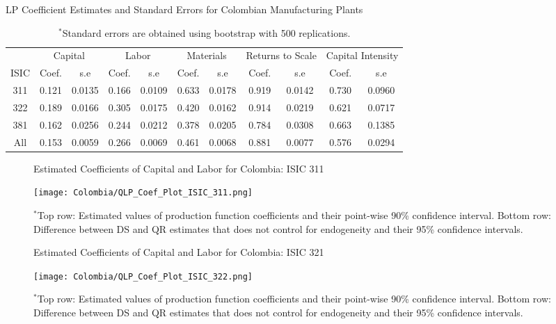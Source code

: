 \documentclass[12pt]{article}
\begin{document}
\begin{appendices}
\begin{table}[H]
\centering
\caption{LP Coefficient Estimates and Standard Errors for Colombian Manufacturing Plants}
\small
\begin{tabular}{ccccccccccc}
  \hline\hline & \multicolumn{2}{c}{Capital} & \multicolumn{2}{c}{Labor} & \multicolumn{2}{c}{Materials} & \multicolumn{2}{c}{Returns to Scale} & \multicolumn{2}{c}{Capital Intensity}\\ \cmidrule(lr){2-3} \cmidrule(lr){4-5} \cmidrule(lr){6-7} \cmidrule(lr){8-9} \cmidrule(lr){10-11}ISIC & Coef. & s.e & Coef. & s.e & Coef. & s.e & Coef. & s.e & Coef. & s.e \\ 
  \hline
311 & 0.121 & 0.0135 & 0.166 & 0.0109 & 0.633 & 0.0178 & 0.919 & 0.0142 & 0.730 & 0.0960 \\ 
  322 & 0.189 & 0.0166 & 0.305 & 0.0175 & 0.420 & 0.0162 & 0.914 & 0.0219 & 0.621 & 0.0717 \\ 
  381 & 0.162 & 0.0256 & 0.244 & 0.0212 & 0.378 & 0.0205 & 0.784 & 0.0308 & 0.663 & 0.1385 \\ 
  All & 0.153 & 0.0059 & 0.266 & 0.0069 & 0.461 & 0.0068 & 0.881 & 0.0077 & 0.576 & 0.0294 \\ 
   \hline
\end{tabular}
\caption*{\footnotesize $^{*}$Standard errors are obtained using bootstrap with 500 replications.}
\label{COLLPcoef}
\end{table}

\begin{figure}[H]
\centering
\caption{Estimated Coefficients of Capital and Labor for Colombia: ISIC 311}
\texttt{[image: Colombia/QLP\_Coef\_Plot\_ISIC\_311.png]}
\caption*{\footnotesize $^{*}$Top row: Estimated values of production function coefficients and their point-wise 90\% confidence interval. Bottom row: Difference between DS and QR estimates that does not control for endogeneity and their 95\% confidence intervals.}
\label{fig:LPCOL311}
\end{figure}

\begin{figure}[H]
\centering
\caption{Estimated Coefficients of Capital and Labor for Colombia: ISIC 321}
\texttt{[image: Colombia/QLP\_Coef\_Plot\_ISIC\_322.png]}
\caption*{\footnotesize $^{*}$Top row: Estimated values of production function coefficients and their point-wise 90\% confidence interval. Bottom row: Difference between DS and QR estimates that does not control for endogeneity and their 95\% confidence intervals.}
\label{fig:LPCOL321}
\end{figure}


\end{appendices}
\end{document}
